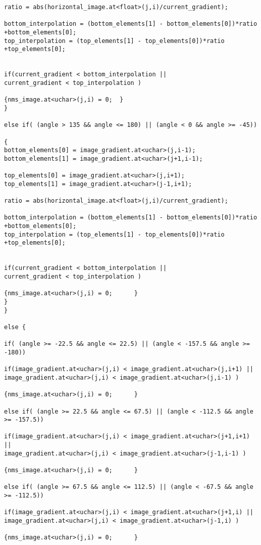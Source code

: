 \begin{lstlisting}
ratio = abs(horizontal_image.at<float>(j,i)/current_gradient);

bottom_interpolation = (bottom_elements[1] - bottom_elements[0])*ratio +bottom_elements[0];
top_interpolation = (top_elements[1] - top_elements[0])*ratio +top_elements[0];			


if(current_gradient < bottom_interpolation ||
current_gradient < top_interpolation )

{nms_image.at<uchar>(j,i) = 0;	}
}

else if( (angle > 135 && angle <= 180) || (angle < 0 && angle >= -45))

{
bottom_elements[0] = image_gradient.at<uchar>(j,i-1);
bottom_elements[1] = image_gradient.at<uchar>(j+1,i-1);

top_elements[0] = image_gradient.at<uchar>(j,i+1);
top_elements[1] = image_gradient.at<uchar>(j-1,i+1);

ratio = abs(horizontal_image.at<float>(j,i)/current_gradient);

bottom_interpolation = (bottom_elements[1] - bottom_elements[0])*ratio +bottom_elements[0];
top_interpolation = (top_elements[1] - top_elements[0])*ratio +top_elements[0];			


if(current_gradient < bottom_interpolation ||
current_gradient < top_interpolation )

{nms_image.at<uchar>(j,i) = 0;		}
}
}

else {

if( (angle >= -22.5 && angle <= 22.5) || (angle < -157.5 && angle >= -180))

if(image_gradient.at<uchar>(j,i) < image_gradient.at<uchar>(j,i+1) ||
image_gradient.at<uchar>(j,i) < image_gradient.at<uchar>(j,i-1) )

{nms_image.at<uchar>(j,i) = 0;		}

else if( (angle >= 22.5 && angle <= 67.5) || (angle < -112.5 && angle >= -157.5))

if(image_gradient.at<uchar>(j,i) < image_gradient.at<uchar>(j+1,i+1) ||
image_gradient.at<uchar>(j,i) < image_gradient.at<uchar>(j-1,i-1) )

{nms_image.at<uchar>(j,i) = 0;		}

else if( (angle >= 67.5 && angle <= 112.5) || (angle < -67.5 && angle >= -112.5))

if(image_gradient.at<uchar>(j,i) < image_gradient.at<uchar>(j+1,i) ||
image_gradient.at<uchar>(j,i) < image_gradient.at<uchar>(j-1,i) )

{nms_image.at<uchar>(j,i) = 0;		}


\end{lstlisting}

